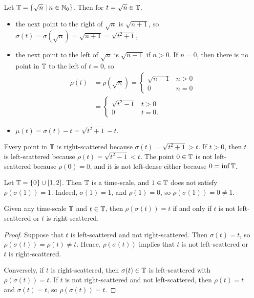 \documentclass[nonumber]{homework}
\begin{document}
	\maketitle
	
	Let $\mathbb{T} = \{\sqrt{n} \mid n \in \mathbb{N}_0\}$. Then for $t = \sqrt{n} \in \mathbb{T}$,
	\begin{itemize}
		\item the next point to the right of $\sqrt{n}$ is $\sqrt{n+1}$, so $\sigma(t) = \sigma(\sqrt{n}) = \sqrt{n+1} = \sqrt{t^2 + 1}$,
		\item the next point to the left of $\sqrt{n}$ is $\sqrt{n-1}$ if $n > 0$. If $n = 0$, then there is no point in $\mathbb{T}$ to the left of $t=0$, so
		\begin{align*}
			\rho(t) &= \rho(\sqrt{n}) = \begin{cases}
				\sqrt{n-1} & n > 0 \\
				0 & n = 0
			\end{cases}\\
			&= \begin{cases}
				\sqrt{t^2-1} & t > 0 \\
				0 & t = 0.
			\end{cases}
		\end{align*}
		\item $\mu(t) = \sigma(t) - t = \sqrt{t^2 + 1} - t$.
	\end{itemize}
	Every point in $\mathbb{T}$ is right-scattered because $\sigma(t) = \sqrt{t^2 + 1} > t$. If $t > 0$, then $t$ is left-scattered because $\rho(t) = \sqrt{t^2-1} < t$. The point $0 \in \mathbb{T}$ is not left-scattered because $\rho(0) =0$, and it is not left-dense either because $0 = \inf \mathbb{T}$.
	
	Let $\mathbb{T} = \{0\} \cup [1,2]$. Then $\mathbb{T}$ is a time-scale, and $1 \in \mathbb{T}$ does not satisfy $\rho(\sigma(1)) = 1$. Indeed, $\sigma(1) = 1$, and $\rho(1) = 0$, so $\rho(\sigma(1)) = 0 \ne 1$.
	
	Given any time-scale $\mathbb{T}$ and $t \in \mathbb{T}$, then $\rho(\sigma(t)) = t$ if and only if $t$ is not left-scattered or $t$ is right-scattered.
	
	\begin{proof}
		Suppose that $t$ is left-scattered and not right-scattered. Then $\sigma(t) = t$, so $\rho(\sigma(t)) = \rho(t) \ne t$. Hence, $\rho(\sigma(t))$ implies that $t$ is not left-scattered or $t$ is right-scattered.
		
		Conversely, if $t$ is right-scattered, then $\sigma(t) \in \mathbb{T}$ is left-scattered with $\rho(\sigma(t)) = t$. If $t$ is not right-scattered and not left-scattered, then $\rho(t) = t$ and $\sigma(t) = t$, so $\rho(\sigma(t)) = t$.
	\end{proof}
	
\end{document}
